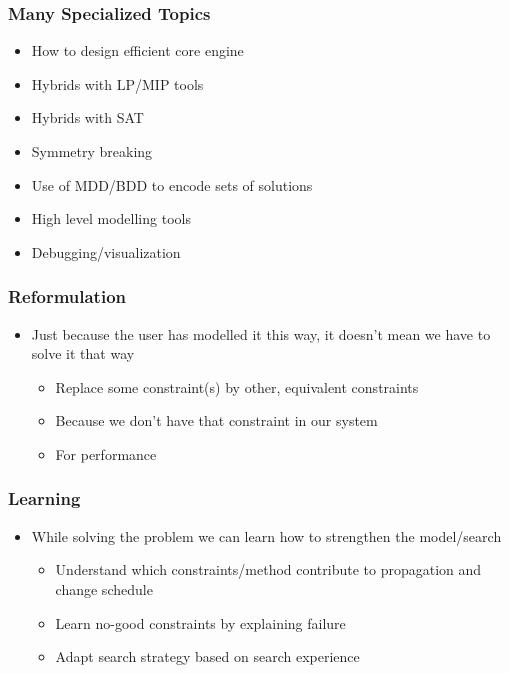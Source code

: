 \begin{frame}
\frametitle{Many Specialized Topics}
\begin{itemize}
\item How to design efficient core engine
\item Hybrids with LP/MIP tools
\item Hybrids with SAT
\item Symmetry breaking
\item Use of MDD/BDD to encode sets of solutions
\item High level modelling tools
\item Debugging/visualization
\end{itemize}
\end{frame}

\begin{frame}
\frametitle{Reformulation}
\begin{itemize}
\item Just because the user has modelled it this way, it doesn't mean we have to solve it that way
\begin{itemize}
\item Replace some constraint(s) by other, equivalent constraints
\item Because we don't have that constraint in our system
\item For performance
\end{itemize}
\end{itemize}
\end{frame}

\begin{frame}
\frametitle{Learning}
\begin{itemize}
\item While solving the problem we can learn how to strengthen the model/search 
\begin{itemize}
\item Understand which constraints/method contribute to propagation and change schedule
\item Learn no-good constraints by explaining failure
\item Adapt search strategy based on search experience
\end{itemize}
\end{itemize}
\end{frame}

